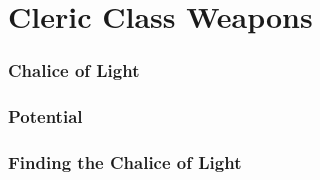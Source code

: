 \section{Cleric Class Weapons}

\subsubsection{Chalice of Light}



\subsubsection{Potential}

\subsubsection{Finding the Chalice of Light}